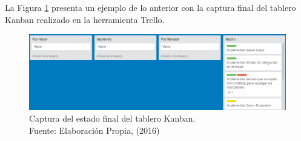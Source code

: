 La Figura \ref{fig:trello} presenta un ejemplo de lo anterior con la captura final del tablero Kanban realizado en la herramienta Trello.

\begin{figure}[H]
	\centering
	\captionsetup{justification=centering}
	\includegraphics[scale=0.5]{images/Trello.png}
	\caption[Captura del estado final del tablero Kanban.]{Captura del estado final del tablero Kanban.\\Fuente: Elaboración Propia, (2016)}
	\label{fig:trello}
\end{figure}